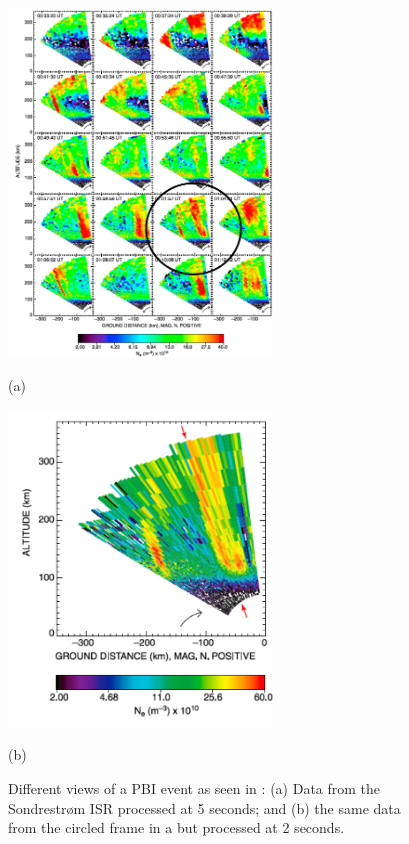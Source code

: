 \begin{figure}[htb]
  \begin{minipage}[t]{0.49\linewidth}\centering
    \includegraphics[width=7cm]{pbiall}
    \medskip
    \centerline{(a)}
  \end{minipage}\hfill
  \begin{minipage}[t]{0.49\linewidth}\centering
    \includegraphics[width=7cm]{pbifast}
    \medskip
    \centerline{(b)}
  \end{minipage}
  \caption{Different views of a PBI event as seen in \cite{Semeter:2005fo}: (a) Data from the Sondrestrøm ISR processed at 5 seconds; and (b) the same data from the circled frame in a but processed at 2 seconds.}
  \label{fig:Sampling}
\end{figure}

